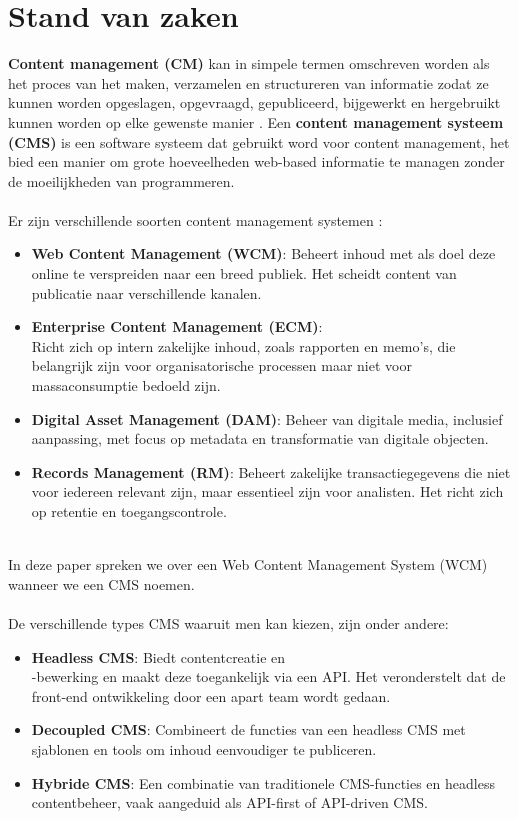 
\section{Stand van zaken}%
\label{sec:Stand van zaken}

\noindent
\textbf{Content management (CM)} kan in simpele termen omschreven worden als het proces van het maken, verzamelen en structureren van informatie zodat ze kunnen worden opgeslagen, opgevraagd, gepubliceerd, bijgewerkt en hergebruikt kunnen worden op elke gewenste manier \autocite{Sunny2008}. Een \textbf{content management systeem (CMS)} is een software systeem dat gebruikt word voor content management, het bied een manier om grote hoeveelheden web-based informatie te managen zonder de moeilijkheden van programmeren.
\\ \\
Er zijn verschillende soorten content management systemen \autocite{Singh2023}:
\begin{itemize}
    \item \textbf{Web Content Management (WCM)}: Beheert inhoud met als doel deze online te verspreiden naar een breed publiek. Het scheidt content van publicatie naar verschillende kanalen.
    \item \textbf{Enterprise Content Management (ECM)}:\\Richt zich op intern zakelijke inhoud, zoals rapporten en memo’s, die belangrijk zijn voor organisatorische processen maar niet voor massaconsumptie bedoeld zijn.
    \item \textbf{Digital Asset Management (DAM)}: Beheer van digitale media, inclusief aanpassing, met focus op metadata en transformatie van digitale objecten.
    \item \textbf{Records Management (RM)}: Beheert zakelijke transactiegegevens die niet voor iedereen relevant zijn, maar essentieel zijn voor analisten. Het richt zich op retentie en toegangscontrole.
\end{itemize}
\\
In deze paper spreken we over een Web Content Management System (WCM) wanneer we een CMS noemen.
\\ \\
De verschillende types CMS waaruit men kan kiezen, zijn onder andere:
\begin{itemize}
    \item \textbf{Headless CMS}: Biedt contentcreatie en\\-bewerking en maakt deze toegankelijk via een API. Het veronderstelt dat de front-end ontwikkeling door een apart team wordt gedaan.
    \item \textbf{Decoupled CMS}: Combineert de functies van een headless CMS met sjablonen en tools om inhoud eenvoudiger te publiceren.
    \item \textbf{Hybride CMS}: Een combinatie van traditionele CMS-functies en headless contentbeheer, vaak aangeduid als API-first of API-driven CMS.
\end{itemize}

